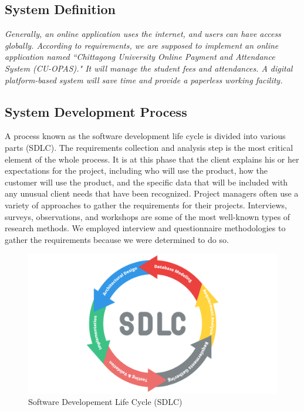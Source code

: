 \clearpage

\subsection{System Definition}\label{subsec:sd} 

\textit{Generally, an online application uses the internet, and users can have access globally. According to requirements, we are supposed to implement an online application named ``Chittagong University Online Payment and Attendance System (CU-OPAS)." It will manage the student fees and attendances. A digital platform-based system will save time and provide a paperless working facility.}


\subsection{System Development Process}\label{subsec:sdp}

A process known as the software development life cycle is divided into various parts (SDLC). The requirements collection and analysis step is the most critical element of the whole process. It is at this phase that the client explains his or her expectations for the project, including who will use the product, how the customer will use the product, and the specific data that will be included with any unusual client needs that have been recognized. Project managers often use a variety of approaches to gather the requirements for their projects. Interviews, surveys, observations, and workshops are some of the most well-known types of research methods. We employed interview and questionnaire methodologies to gather the requirements because we were determined to do so.\\

\begin{figure}[H]
    \centering
    \includegraphics[width=1\textwidth]{images/sdlc}
    \caption{Software Developement Life Cycle (SDLC)}
    \label{fig:sdlc}
\end{figure}


